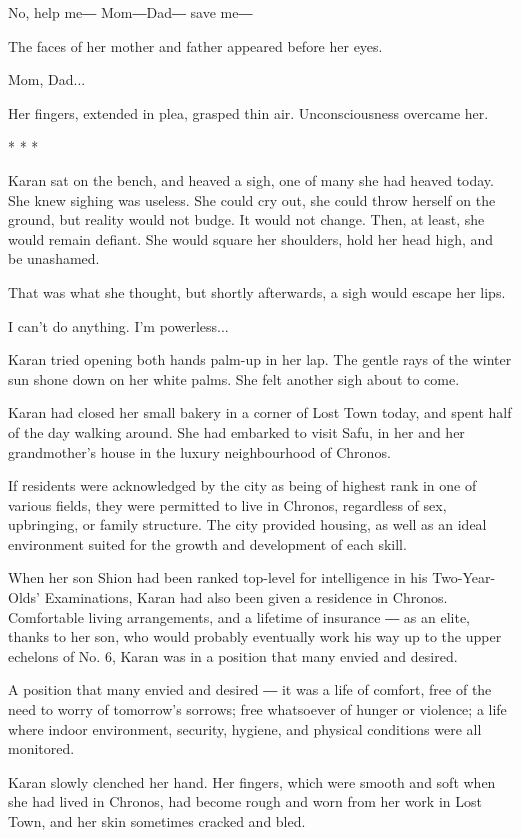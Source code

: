 No, help me― Mom―Dad― save me―

The faces of her mother and father appeared before her eyes.

Mom, Dad...

Her fingers, extended in plea, grasped thin air. Unconsciousness
overcame her.

* * *

Karan sat on the bench, and heaved a sigh, one of many she had heaved
today. She knew sighing was useless. She could cry out, she could throw
herself on the ground, but reality would not budge. It would not change.
Then, at least, she would remain defiant. She would square her
shoulders, hold her head high, and be unashamed.

That was what she thought, but shortly afterwards, a sigh would escape
her lips.

I can't do anything. I'm powerless...

Karan tried opening both hands palm-up in her lap. The gentle rays of
the winter sun shone down on her white palms. She felt another sigh
about to come.

Karan had closed her small bakery in a corner of Lost Town today, and
spent half of the day walking around. She had embarked to visit Safu, in
her and her grandmother's house in the luxury neighbourhood of Chronos.

If residents were acknowledged by the city as being of highest rank in
one of various fields, they were permitted to live in Chronos,
regardless of sex, upbringing, or family structure. The city provided
housing, as well as an ideal environment suited for the growth and
development of each skill.

When her son Shion had been ranked top-level for intelligence in his
Two-Year-Olds' Examinations, Karan had also been given a residence in
Chronos. Comfortable living arrangements, and a lifetime of insurance ―
as an elite, thanks to her son, who would probably eventually work his
way up to the upper echelons of No. 6, Karan was in a position that many
envied and desired.

A position that many envied and desired ― it was a life of comfort, free
of the need to worry of tomorrow's sorrows; free whatsoever of hunger or
violence; a life where indoor environment, security, hygiene, and
physical conditions were all monitored.

Karan slowly clenched her hand. Her fingers, which were smooth and soft
when she had lived in Chronos, had become rough and worn from her work
in Lost Town, and her skin sometimes cracked and bled.

